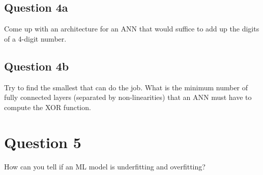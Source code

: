 \documentclass{kthreport}
\begin{document}
\subsection{Question 4a}
Come up with an architecture for an ANN that would suffice to add up the digits of a 4-digit number.

\subsection{Question 4b}
Try to find the smallest that can do the job.
What is the minimum number of fully connected layers (separated by non-linearities)
that an ANN must have to compute the XOR function.

\section{Question 5}
How can you tell if an ML model is underfitting and overfitting?

\medskip



\end{document}
